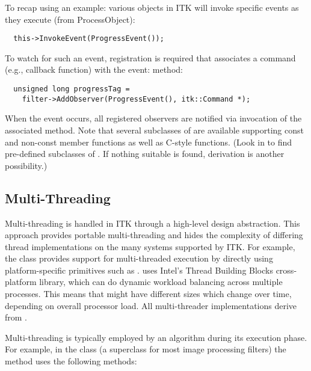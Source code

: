 To recap using an example: various objects in ITK will invoke specific events
as they execute (from ProcessObject):
\small
\begin{verbatim}
  this->InvokeEvent(ProgressEvent());
\end{verbatim}
\normalsize

To watch for such an event, registration is required that associates a
command (e.g., callback function) with the event:
 method:
\small
\begin{verbatim}
  unsigned long progressTag =
    filter->AddObserver(ProgressEvent(), itk::Command *);
\end{verbatim}
\normalsize

When the event occurs, all registered observers are notified via invocation
of the associated  method. Note that several
subclasses of  are available supporting const and
non-const member functions as well as C-style functions. (Look in
 to find pre-defined subclasses of
. If nothing suitable is found, derivation is another
possibility.)

\subsection{Multi-Threading}
\label{sec:MultiThreading}

Multi-threading is handled in ITK through a high-level design
abstraction. This approach provides portable multi-threading and hides the
complexity of differing thread implementations on the many systems supported
by ITK. For example, the class  provides support for
multi-threaded execution by directly using platform-specific primitives such as
.  uses Intel's
Thread Building Blocks cross-platform library,
which can do dynamic workload balancing across multiple processes.
This means that  might have different sizes
which change over time, depending on overall processor load.
All multi-threader implementations derive from .

Multi-threading is typically employed by an algorithm during its execution
phase. For example, in the
class  (a superclass for most image processing filters)
the  method uses the following methods:

